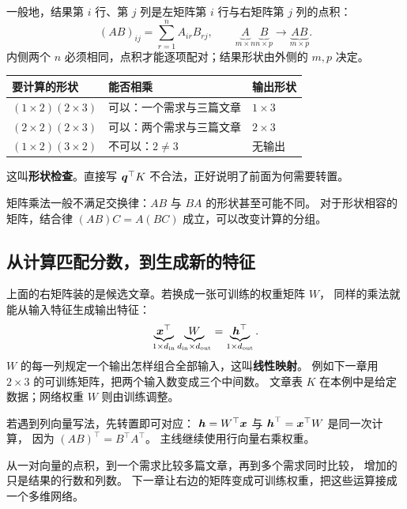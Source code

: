 一般地，结果第 $i$ 行、第 $j$ 列是左矩阵第 $i$ 行与右矩阵第 $j$ 列的点积：
\[
(AB)_{ij}=\sum_{r=1}^{n}A_{ir}B_{rj},\qquad
\underbrace{A}_{m\times n}\underbrace{B}_{n\times p}
\longrightarrow\underbrace{AB}_{m\times p}.
\]
内侧两个 $n$ 必须相同，点积才能逐项配对；结果形状由外侧的 $m,p$ 决定。
\begin{center}\small
{}
\begin{tabular}{@{}lll@{}}\toprule
要计算的形状 & 能否相乘 & 输出形状\\\midrule
$(1\times2)(2\times3)$ & 可以：一个需求与三篇文章 & $1\times3$\\
$(2\times2)(2\times3)$ & 可以：两个需求与三篇文章 & $2\times3$\\
$(1\times2)(3\times2)$ & 不可以：$2\ne3$ & 无输出\\\bottomrule
\end{tabular}
\end{center}
这叫\textbf{形状检查}。直接写 $\boldsymbol{q}^\top K$ 不合法，正好说明了前面为何需要转置。

\begin{warningbox}
矩阵乘法一般不满足交换律：$AB$ 与 $BA$ 的形状甚至可能不同。
对于形状相容的矩阵，结合律 $(AB)C=A(BC)$ 成立，可以改变计算的分组。
\end{warningbox}

\subsection{从计算匹配分数，到生成新的特征}
\label{concept:linear-map}

上面的右矩阵装的是候选文章。若换成一张可训练的权重矩阵 $W$，
同样的乘法就能从输入特征生成输出特征：
\[
\underbrace{\boldsymbol{x}^\top}_{1\times d_{\rm in}}
\underbrace{W}_{d_{\rm in}\times d_{\rm out}}
=\underbrace{\boldsymbol{h}^\top}_{1\times d_{\rm out}}.
\]
$W$ 的每一列规定一个输出怎样组合全部输入，这叫\textbf{线性映射}。
例如下一章用 $2\times3$ 的可训练矩阵，把两个输入数变成三个中间数。
文章表 $K$ 在本例中是给定数据；网络权重 $W$ 则由训练调整。

若遇到列向量写法，先转置即可对应：
$\boldsymbol{h}=W^\top\boldsymbol{x}$ 与 $\boldsymbol{h}^\top=\boldsymbol{x}^\top W$ 是同一次计算，
因为 $(AB)^\top=B^\top A^\top$。
主线继续使用行向量右乘权重。


\par\smallskip
从一对向量的点积，到一个需求比较多篇文章，再到多个需求同时比较，
增加的只是结果的行数和列数。
下一章让右边的矩阵变成可训练权重，把这些运算接成一个多维网络。
